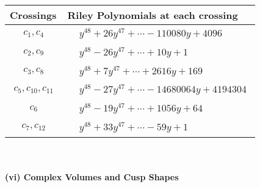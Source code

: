 \documentclass[1p]{elsarticle_modified}
\theoremstyle{definition}
\begin{document}
\begin{tabular}{m{50pt}|m{274pt}}
Crossings & \hspace{64pt}Riley Polynomials at each crossing \\
\hline $$\begin{aligned}c_{1},c_{4}\end{aligned}$$&$\begin{aligned}
&y^{48}+26 y^{47}+\cdots-110080 y+4096
\end{aligned}$\\
\hline $$\begin{aligned}c_{2},c_{9}\end{aligned}$$&$\begin{aligned}
&y^{48}-26 y^{47}+\cdots+10 y+1
\end{aligned}$\\
\hline $$\begin{aligned}c_{3},c_{8}\end{aligned}$$&$\begin{aligned}
&y^{48}+7 y^{47}+\cdots+2616 y+169
\end{aligned}$\\
\hline $$\begin{aligned}c_{5},c_{10},c_{11}\end{aligned}$$&$\begin{aligned}
&y^{48}-27 y^{47}+\cdots-14680064 y+4194304
\end{aligned}$\\
\hline $$\begin{aligned}c_{6}\end{aligned}$$&$\begin{aligned}
&y^{48}-19 y^{47}+\cdots+1056 y+64
\end{aligned}$\\
\hline $$\begin{aligned}c_{7},c_{12}\end{aligned}$$&$\begin{aligned}
&y^{48}+33 y^{47}+\cdots-59 y+1
\end{aligned}$\\
\hline
\end{tabular}\\~\\
\newpage\flushleft \textbf{(vi) Complex Volumes and Cusp Shapes}
\end{document}
